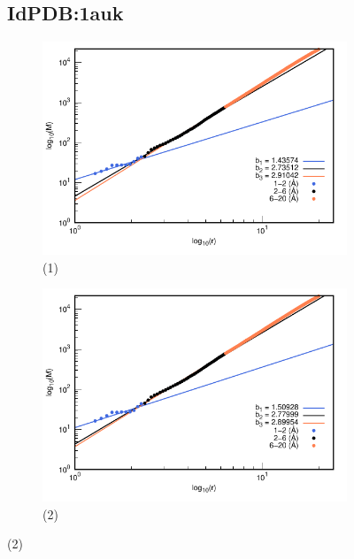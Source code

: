 \begin{figure}[H]
	\subsection*{IdPDB:1auk}
	\hspace{-0.3cm} 
	\begin{subfigure}{0.49\textwidth}
		\centering
		\includegraphics[width=\linewidth,page=1]{graphs/PDBs/1auk/1aukaddH.pdf}
		\caption{(1)}
	\end{subfigure}
	\hspace{0.2cm}
	\begin{subfigure}{0.49\textwidth}
		\centering
		\includegraphics[width=\linewidth,page=1]{graphs/PDBs/1auk/1aukEm.pdf}
		\caption{(2)}
	\end{subfigure}
	

\end{figure}
